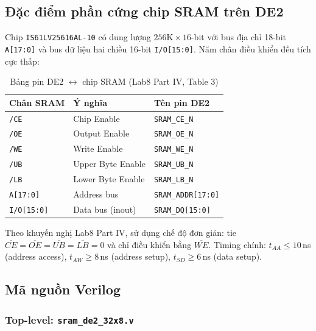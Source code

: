\documentclass[12pt,a4paper]{article}
\begin{document}
\subsection{Đặc điểm phần cứng chip SRAM trên DE2}

Chip \texttt{IS61LV25616AL-10} có dung lượng $256\text{K} \times 16$-bit với bus địa chỉ 18-bit \texttt{A[17:0]} và bus dữ liệu hai chiều 16-bit \texttt{I/O[15:0]}. Năm chân điều khiển đều tích cực thấp:

\begin{table}[H]
\centering
\begin{tabular}{l|l|l}
\toprule
\textbf{Chân SRAM} & \textbf{Ý nghĩa} & \textbf{Tên pin DE2} \\
\midrule
\texttt{/CE} & Chip Enable & \texttt{SRAM\_CE\_N} \\
\texttt{/OE} & Output Enable & \texttt{SRAM\_OE\_N} \\
\texttt{/WE} & Write Enable & \texttt{SRAM\_WE\_N} \\
\texttt{/UB} & Upper Byte Enable & \texttt{SRAM\_UB\_N} \\
\texttt{/LB} & Lower Byte Enable & \texttt{SRAM\_LB\_N} \\
\texttt{A[17:0]}  & Address bus & \texttt{SRAM\_ADDR[17:0]} \\
\texttt{I/O[15:0]}& Data bus (inout) & \texttt{SRAM\_DQ[15:0]} \\
\bottomrule
\end{tabular}
\caption{Bảng pin DE2 $\leftrightarrow$ chip SRAM (Lab8 Part IV, Table 3)}
\end{table}

Theo khuyến nghị Lab8 Part IV, sử dụng chế độ đơn giản: tie $\overline{CE}=\overline{OE}=\overline{UB}=\overline{LB}=0$ và chỉ điều khiển bằng $\overline{WE}$. Timing chính: $t_{AA} \leq 10$\,ns (address access), $t_{AW} \geq 8$\,ns (address setup), $t_{SD} \geq 6$\,ns (data setup).

\subsection{Mã nguồn Verilog}

\subsubsection{Top-level: \texttt{sram\_de2\_32x8.v}}

\end{document}

